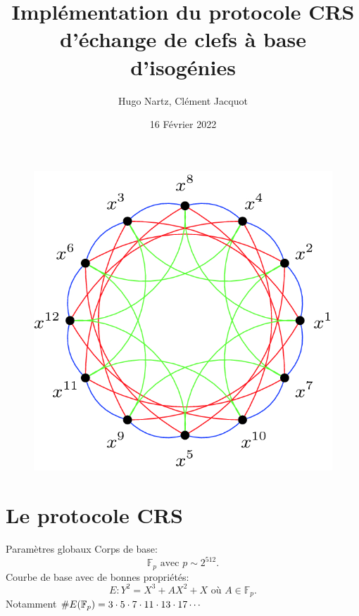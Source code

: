 \documentclass{beamer}
\title{Implémentation du protocole CRS d'échange de clefs à base d'isogénies }
\author{Hugo Nartz, Cl\'ement Jacquot}
\date{16 F\'evrier 2022}
\begin{document}
\begin{frame}
  \titlepage
\begin{figure}[h]
\centering
\includegraphics[scale=0.12]{../figs/isoGraph}
\end{figure}
\end{frame}


\section{Le protocole CRS}

\begin{frame}{Param\`etres globaux}
	Corps de base:
	\[
		\mathbb{F}_p \text{ avec } p\sim 2^{512}.
	\]
	Courbe de base avec de bonnes propri\'et\'es:
	\[
		E: Y^2 = X^3 + AX^2 + X  \text{ o\`u } A\in  \mathbb{F}_p.
	\]
	Notamment $\# E(\mathbb{F}_p) = 3\cdot 5\cdot 7\cdot 11 \cdot 13\cdot 17\cdots$
\end{frame}
\end{document}
